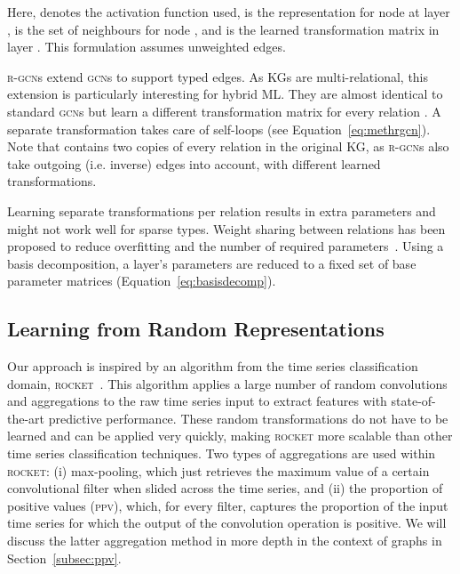 \documentclass{llncs}
\begin{document}
Here,  denotes the activation function used,  is the representation for node  at layer ,  is the set of neighbours for node , and  is the learned transformation matrix in layer . This formulation assumes unweighted edges.

\textsc{r-gcn}s extend \textsc{gcn}s to support typed edges. As KGs are multi-relational, this extension is particularly interesting for hybrid ML. They are almost identical to standard \textsc{gcn}s but learn a different transformation matrix  for every relation . A separate transformation  takes care of self-loops (see Equation~\ref{eq:methrgcn}). Note that  contains two copies of every relation in the original KG, as \textsc{r-gcn}s also take outgoing (i.e. inverse) edges into account, with different learned transformations.

Learning separate transformations per relation results in extra parameters and might not work well for sparse types. Weight sharing between relations has been proposed to reduce overfitting and the number of required parameters~\cite{schlichtkrull2018modeling}. Using a basis decomposition, a layer's parameters are reduced to a fixed set of base parameter matrices  (Equation~\ref{eq:basisdecomp}).



\subsection{Learning from Random Representations}
Our approach is inspired by an algorithm from the time series classification domain, \textsc{rocket}~\cite{dempster2020rocket,dempster2021minirocket}. This algorithm applies a large number of random convolutions and aggregations to the raw time series input to extract features with state-of-the-art predictive performance. These random transformations do not have to be learned and can be applied very quickly, making \textsc{rocket} more scalable than other time series classification techniques. Two types of aggregations are used within \textsc{rocket}: (i) max-pooling, which just retrieves the maximum value of a certain convolutional filter when slided across the time series, and (ii) the proportion of positive values (\textsc{ppv}), which, for every filter, captures the proportion of the input time series for which the output of the convolution operation is positive. We will discuss the latter aggregation method in more depth in the context of graphs in Section~\ref{subsec:ppv}.
\end{document}

